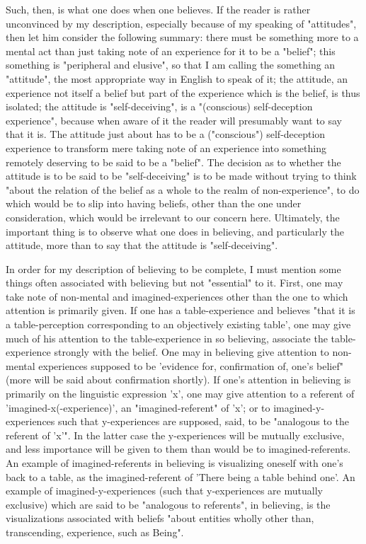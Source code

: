 \documentclass[10pt,twoside]{memoir}
\begin{document}
\begin{enumerate}
{Such, then, is what one does when one believes. If the reader is rather 
unconvinced by my description, especially because of my speaking of 
"attitudes", then let him consider the following summary: there must be 
something more to a mental act than just taking note of an experience for it 
to be a "belief"; this something is "peripheral and elusive", so that I am 
calling the something an "attitude", the most appropriate way in English to 
speak of it; the attitude, an experience not itself a belief but part of the 
experience which is the belief, is thus isolated; the attitude is 
"self-deceiving", is a "(conscious) self-deception experience", because when 
aware of it the reader will presumably want to say that it is. The attitude just 
about has to be a ("conscious") self-deception experience to transform mere 
taking note of an experience into something remotely deserving to be said to 
be a "belief". The decision as to whether the attitude is to be said to be 
"self-deceiving" is to be made without trying to think "about the relation of 
the belief as a whole to the realm of non-experience", to do which would be 
to slip into having beliefs, other than the one under consideration, which 
would be irrelevant to our concern here. Ultimately, the important thing is 
to observe what one does in believing, and particularly the attitude, more 
than to say that the attitude is "self-deceiving". 

In order for my description of believing to be complete, I must mention 
some things often associated with believing but not "essential" to it. First, 
one may take note of non-mental and imagined-experiences other than the 
one to which attention is primarily given. If one has a table-experience and 
believes "that it is a table-perception corresponding to an objectively existing 
table', one may give much of his attention to the table-experience in so 
believing, associate the table-experience strongly with the belief. One may in 
believing give attention to non-mental experiences supposed to be 'evidence 
for, confirmation of, one's belief" (more will be said about confirmation 
shortly). If one's attention in believing is primarily on the linguistic 
expression 'x', one may give attention to a referent of 
'imagined-x(-experience)', an "imagined-referent" of 'x'; or to 
imagined-y-experiences such that y-experiences are supposed, said, to be 
"analogous to the referent of 'x'". In the latter case the y-experiences will be 
mutually exclusive, and less importance will be given to them than would be 
to imagined-referents. An example of imagined-referents in believing is 
visualizing oneself with one's back to a table, as the imagined-referent of 
'There being a table behind one'. An example of imagined-y-experiences 
(such that y-experiences are mutually exclusive) which are said to be 
"analogous to referents", in believing, is the visualizations associated with 
beliefs "about entities wholly other than, transcending, experience, such as 
Being". 

}
\end{enumerate}
\end{document}

